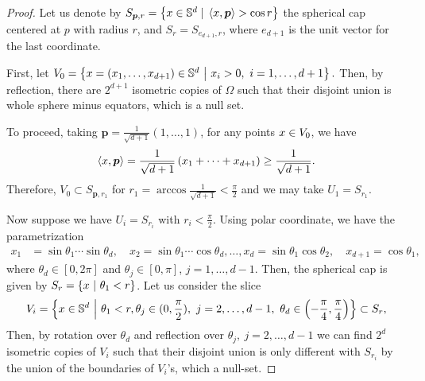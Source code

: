 \begin{proof}
  Let us denote by $S_{\bm{p}, r} = \left\{ x \in \mathbb{S}^d \;|\; \left\langle{x,\bm{p}}\right\rangle > \cos r \right\}$
  the spherical cap centered at $p$ with radius $r$,
  and $S_r = S_{{e}_{d+1},r}$, where ${e}_{d+1}$ is the unit vector for the last coordinate.

  First, let $V_0 = \left\{ x = (x_1,\dots,x_{d+1}) \in \mathbb{S}^d ~\big|~ x_i > 0,~ i=1,\dots,d+1 \right\}.$
  Then, by reflection, there are $2^{d+1}$ isometric copies of $\Omega$
  such that their disjoint union is whole sphere minus equators,
  which is a null set.

  To proceed, taking $\bm{p} = \frac{1}{\sqrt {d+1}}(1,\dots,1)$, for any points $x \in V_0$, we have
  \begin{align*}
    \left\langle{x,\bm{p}}\right\rangle = \frac{1}{\sqrt {d+1}}\left( x_1 + \dots + x_{d+1} \right) \geq \frac{1}{\sqrt {d+1}}.
  \end{align*}
  Therefore, $V_0 \subset S_{\bm{p},r_1}$ for $r_1 = \arccos \frac{1}{\sqrt {d+1}} < \frac{\pi}{2}$
  and we may take $U_1 = S_{r_1}$.

  Now suppose we have $U_i = S_{r_i}$ with $r_i < \frac{\pi}{2}$.
  Using polar coordinate, we have the parametrization
  \begin{align}
    \label{eq:4_PolarCoord}
    x_1 &= \sin \theta_1 \cdots \sin \theta_d,\quad    x_2 = \sin \theta_1 \cdots \cos \theta_d,
    \dots,          x_{d} = \sin\theta_1 \cos \theta_2,\quad    x_{d+1} = \cos\theta_1,
  \end{align}
  where $\theta_d \in [0,2\pi]$ and $\theta_j \in [0,\pi]$, $j = 1,\dots,d-1$.
  Then, the spherical cap is given by $S_r = \left\{ x ~|~ \theta_1 < r \right\}$.
  Let us consider the slice
  \begin{align*}
    V_i = \left\{ x \in \mathbb{S}^d ~\Big|~ \theta_1 < r,\theta_j \in (0,\frac{\pi}{2}),~j=2,\dots,d-1,\
    \theta_d \in \left(-\frac{\pi}{4},\frac{\pi}{4}\right) \right\}
    \subset S_{r},
  \end{align*}
  Then, by rotation over $\theta_d$ and reflection over $\theta_{j},~j=2,\dots,d-1$
  we can find $2^{d}$ isometric copies of $V_i$ such that their disjoint union
  is only different with $S_{r_i}$ by the union of the boundaries of $V_i$'s,
  which a null-set.


\end{proof}
